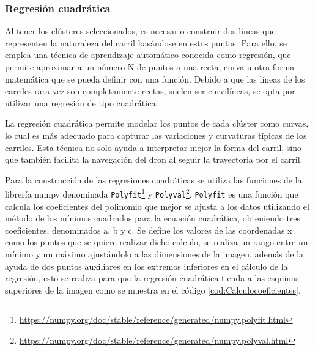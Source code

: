 \subsubsection{Regresión cuadrática}
\label{sec:Regresión cuadrática}
Al tener los clústeres seleccionados, es necesario construir dos líneas que representen la naturaleza del carril basándose en estos puntos. Para ello, se emplea una técnica de aprendizaje 
automático conocida como regresión, que permite aproximar a un número N de puntos a una recta, curva u otra forma matemática que se pueda definir con una función. 
Debido a que las líneas de los carriles rara vez son 
completamente rectas, suelen ser curvilíneas, se opta por utilizar una regresión de tipo cuadrática. 

La regresión cuadrática permite modelar los puntos de cada clúster como curvas, lo cual es más adecuado para capturar las variaciones y curvaturas típicas de los carriles. Esta técnica no solo
ayuda a interpretar mejor la forma del carril, sino que también facilita la navegación del dron al seguir la trayectoria por el carril.

Para la construcción de las regresiones cuadráticas se utiliza las funciones de la librería numpy denominada \texttt{Polyfit}\footnote{\url{https://numpy.org/doc/stable/reference/generated/numpy.polyfit.html}}
y \texttt{Polyval}\footnote{\url{ https://numpy.org/doc/stable/reference/generated/numpy.polyval.html}}. 
\texttt{Polyfit} es una función que calcula los coeficientes del polinomio que mejor se ajusta a los datos utilizando el método de los mínimos 
cuadrados para la ecuación cuadrática, obteniendo tres coeficientes, denominados a, b y c. Se define los valores de las coordenadas x como los puntos que se quiere
realizar dicho calculo, se realiza un rango entre un mínimo y un máximo ajustándolo a las dimensiones de la imagen, además de la ayuda de 
dos puntos auxiliares en los extremos inferiores en el cálculo de la regresión, esto se realiza para que la regresión cuadrática tienda a las esquinas superiores de la imagen 
como se muestra en el código \ref{cod:Calculocoeficientes}.
 

